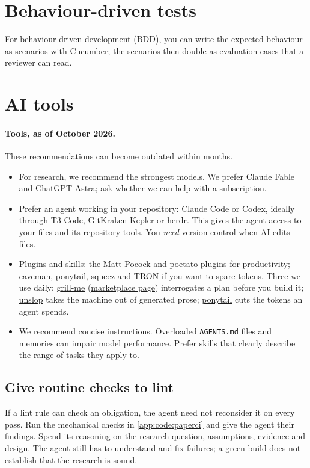 \section{Behaviour-driven tests}
For behaviour-driven development (BDD), you can write the expected behaviour as scenarios with \href{https://cucumber.io/}{Cucumber}; the scenarios then double as evaluation cases that a reviewer can read.

\section{AI tools}\label{app:code:ai}
\paragraph{Tools, as of October 2026.} These recommendations can become outdated within months.
\begin{itemize}
  \item For research, we recommend the strongest models. We prefer Claude Fable and ChatGPT Astra; ask whether we can help with a subscription.
  \item Prefer an agent working in your repository: Claude Code or Codex, ideally through T3 Code, GitKraken Kepler or herdr. This gives the agent access to your files and its repository tools. You \emph{need} version control when AI edits files.
  \item Plugins and skills: the Matt Pocock and poetato plugins for productivity; caveman, ponytail, squeez and TRON if you want to spare tokens. Three we use daily: \href{https://www.aihero.dev/skills-grill-me}{grill-me} (\href{https://claudemarketplaces.com/skills/mattpocock/skills/grill-me}{marketplace page}) interrogates a plan before you build it; \href{https://github.com/cursor/plugins/blob/main/pstack/skills/unslop/SKILL.md}{unslop} takes the machine out of generated prose; \href{https://github.com/DietrichGebert/ponytail/blob/main/skills/ponytail/SKILL.md}{ponytail} cuts the tokens an agent spends.
  \item We recommend concise instructions. Overloaded \texttt{AGENTS.md} files and memories can impair model performance. Prefer skills that clearly describe the range of tasks they apply to.
\end{itemize}

\subsection{Give routine checks to lint}\label{app:code:agents}
If a lint rule can check an obligation, the agent need not reconsider it on every pass. Run the mechanical checks in \cref{app:code:paperci} and give the agent their findings. Spend its reasoning on the research question, assumptions, evidence and design. The agent still has to understand and fix failures; a green build does not establish that the research is sound.

